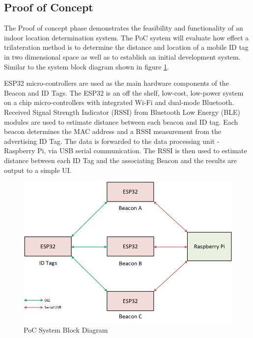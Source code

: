 \pagebreak
\subsection{Proof of Concept}
\medskip
The Proof of concept phase demonstrates the feasibility and functionality of an indoor location determination system. The PoC system will evaluate how effect a trilateration method is to determine the distance and location of a mobile  ID tag in two dimensional space as well as to establish an initial development system. Similar to the system block diagram shown in figure \ref{poc}.

\bigskip
ESP32 micro-controllers are used as the main hardware components of the Beacon and ID Tags. The ESP32 is an off the shelf, low-cost, low-power system on a chip micro-controllers with integrated Wi-Fi and dual-mode Bluetooth. Received Signal Strength Indicator (RSSI) from Bluetooth Low Energy (BLE) modules are used to estimate distance between each beacon and ID tag. Each beacon determines the MAC address and a RSSI measurement from the advertising ID Tag. The data is forwarded to the data processing unit - Raspberry Pi, via USB serial communication. The RSSI is then used to estimate distance between each ID Tag and the associating Beacon and the results are output to a simple UI. 

\medskip
\begin{figure}[H]
\centering
    \includegraphics[width=\linewidth]{./images/01_poc.png}
    \caption{PoC System Block Diagram}
    \label{poc}
\end{figure}



\pagebreak
